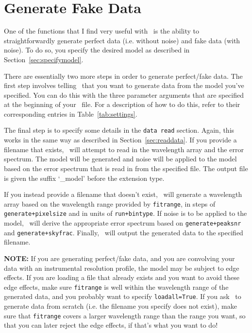\section{Generate Fake Data}

One of the functions that I find very useful with \alis\ is the ability
to straightforwardly generate perfect data (i.e. without noise) and
fake data (with noise). To do so, you specify the desired model
as described in Section~\ref{sec:specifymodel}.

There are essentially two more steps in order to generate perfect/fake data.
The first step involves telling \alis\ that you want to generate data from the model
you've specified. You can do this with the three parameter arguments that
are specified at the beginning of your \dmod\ file. For a description of how
to do this, refer to their corresponding entries in Table~\ref{tab:settings}.

The final step is to specify some details in the \texttt{data read} section. Again,
this works in the same way as described in Section~\ref{sec:readdata}. If you
provide a filename that exists, \alis\ will attempt to read in the wavelength
array and the error spectrum. The model will be generated and noise will be
applied to the model based on the error spectrum that is read in from the
specified file. The output file is given the suffix `\_model' before the extension
type.

If you instead provide a filename that doesn't exist, \alis\ will generate a
wavelength array based on the wavelength range provided by \texttt{fitrange},
in steps of \texttt{generate+pixelsize} and in units of \texttt{run+bintype}. If
noise is to be applied to the model, \alis\ will derive the appropriate error
spectrum based on \texttt{generate+peaksnr} and \texttt{generate+skyfrac}.
Finally, \alis\ will output the generated data to the specified filename.

\textbf{NOTE:} If you are generating perfect/fake data, and you are convolving
your data with an instrumental resolution profile, the model may be subject to
edge effects. If you are loading a file that already exists and you want to avoid
these edge effects, make sure \texttt{fitrange} is well within the wavelength range
of the generated data, and you probably want to specify \texttt{loadall=True}.
If you ask \alis\ to generate data from scratch (i.e. the filename you specify does
not exist), make sure that \texttt{fitrange} covers a larger wavelength range
than the range you want, so that you can later reject the edge effects, if that's
what you want to do!
